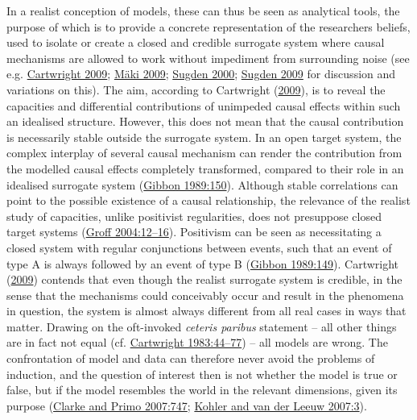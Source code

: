\documentclass[
  12pt,
  a4paper,
  oneside]{book}
\begin{document}
In a realist conception of models, these can thus be seen as analytical tools, the purpose of which is to provide a concrete representation of the researchers beliefs, used to isolate or create a closed and credible surrogate system where causal mechanisms are allowed to work without impediment from surrounding noise (see e.g. \protect\hyperlink{ref-cartwright2009}{Cartwright 2009}; \protect\hyperlink{ref-muxe4ki2009}{Mäki 2009}; \protect\hyperlink{ref-sugden2000}{Sugden 2000}; \protect\hyperlink{ref-sugden2009}{Sugden 2009} for discussion and variations on this). The aim, according to Cartwright (\protect\hyperlink{ref-cartwright2009}{2009}), is to reveal the capacities and differential contributions of unimpeded causal effects within such an idealised structure. However, this does not mean that the causal contribution is necessarily stable outside the surrogate system. In an open target system, the complex interplay of several causal mechanism can render the contribution from the modelled causal effects completely transformed, compared to their role in an idealised surrogate system (\protect\hyperlink{ref-gibbon1989}{Gibbon 1989:150}). Although stable correlations can point to the possible existence of a causal relationship, the relevance of the realist study of capacities, unlike positivist regularities, does not presuppose closed target systems (\protect\hyperlink{ref-groff2004}{Groff 2004:12--16}). Positivism can be seen as necessitating a closed system with regular conjunctions between events, such that an event of type A is always followed by an event of type B (\protect\hyperlink{ref-gibbon1989}{Gibbon 1989:149}). Cartwright (\protect\hyperlink{ref-cartwright2009}{2009}) contends that even though the realist surrogate system is credible, in the sense that the mechanisms could conceivably occur and result in the phenomena in question, the system is almost always different from all real cases in ways that matter. Drawing on the oft-invoked \emph{ceteris paribus} statement -- all other things are in fact not equal (cf. \protect\hyperlink{ref-cartwright1983}{Cartwright 1983:44--77}) -- all models are wrong. The confrontation of model and data can therefore never avoid the problems of induction, and the question of interest then is not whether the model is true or false, but if the model resembles the world in the relevant dimensions, given its purpose (\protect\hyperlink{ref-clarke2007}{Clarke and Primo 2007:747}; \protect\hyperlink{ref-kohler2007}{Kohler and van der Leeuw 2007:3}).
\end{document}

